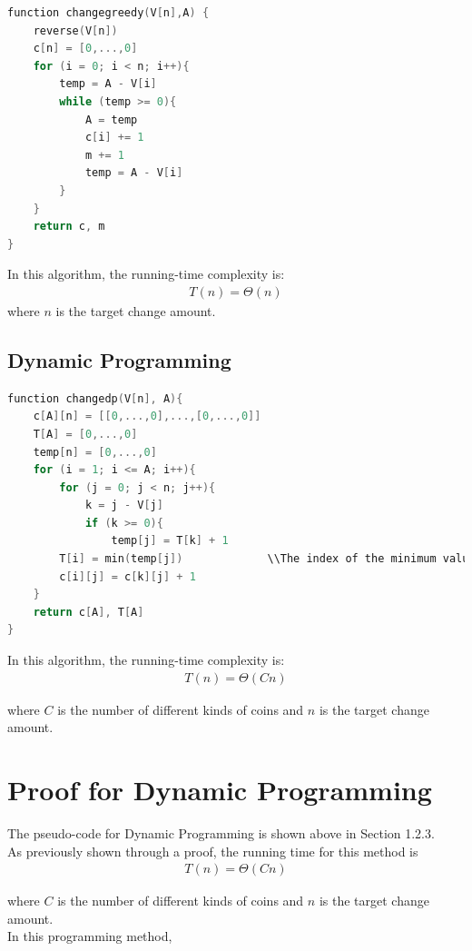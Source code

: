 \documentclass[11pt]{scrreprt}
\begin{document}
\begin{lstlisting}[language=c]
function changegreedy(V[n],A) {
	reverse(V[n])
	c[n] = [0,...,0]
	for (i = 0; i < n; i++){
		temp = A - V[i]
		while (temp >= 0){
		    A = temp
		    c[i] += 1
		    m += 1
		    temp = A - V[i]
		}
	}
	return c, m
}
\end{lstlisting}

In this algorithm, the running-time complexity is:
\begin{eqnarray*}
T(n) = \Theta(n)
\end{eqnarray*}
 where $n$ is the target change amount.
\subsection{Dynamic Programming}

\begin{lstlisting}[language=c]
function changedp(V[n], A){
	c[A][n] = [[0,...,0],...,[0,...,0]]
	T[A] = [0,...,0]
	temp[n] = [0,...,0]
	for (i = 1; i <= A; i++){
		for (j = 0; j < n; j++){
			k = j - V[j]
			if (k >= 0){
				temp[j] = T[k] + 1
		T[i] = min(temp[j])				\\The index of the minimum value of array temp is j.
		c[i][j] = c[k][j] + 1
	}
	return c[A], T[A]
}
\end{lstlisting}

In this algorithm, the running-time complexity is:
\begin{eqnarray*}
T(n) = \Theta(Cn)
\end{eqnarray*}

where $C$ is the number of different kinds of coins and $n$ is the target change amount.


\section{Proof for Dynamic Programming}


The pseudo-code for Dynamic Programming is shown above in Section 1.2.3.\\

As previously shown through a proof, the running time for this method is
\begin{eqnarray*}
T(n)  =  \Theta(Cn)
\end{eqnarray*}

where $C$ is the number of different kinds of coins and $n$ is the target change amount.\\

In this programming method,\\
\end{document}
